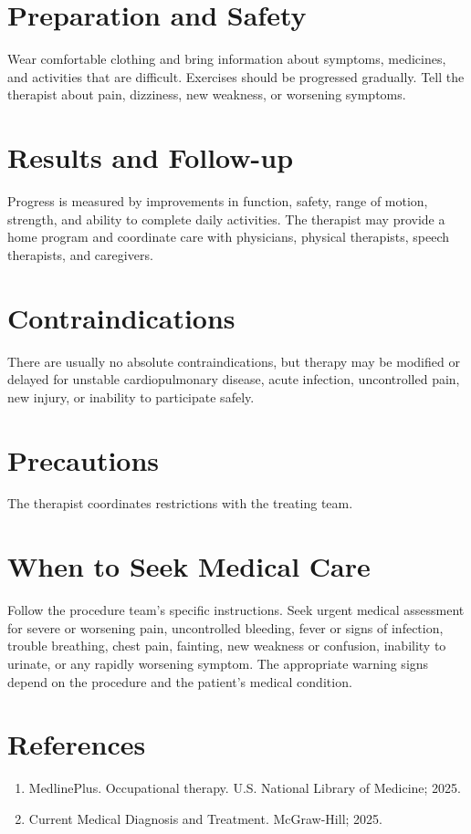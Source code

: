\section*{Preparation and Safety}
Wear comfortable clothing and bring information about symptoms, medicines, and activities that are difficult. Exercises should be progressed gradually. Tell the therapist about pain, dizziness, new weakness, or worsening symptoms.

\section*{Results and Follow-up}
Progress is measured by improvements in function, safety, range of motion, strength, and ability to complete daily activities. The therapist may provide a home program and coordinate care with physicians, physical therapists, speech therapists, and caregivers.

\section*{Contraindications}
There are usually no absolute contraindications, but therapy may be modified or delayed for unstable cardiopulmonary disease, acute infection, uncontrolled pain, new injury, or inability to participate safely.

\section*{Precautions}
The therapist coordinates restrictions with the treating team.

\section*{When to Seek Medical Care}
Follow the procedure team's specific instructions. Seek urgent medical assessment for severe or worsening pain, uncontrolled bleeding, fever or signs of infection, trouble breathing, chest pain, fainting, new weakness or confusion, inability to urinate, or any rapidly worsening symptom. The appropriate warning signs depend on the procedure and the patient's medical condition.

\section*{References}
\begin{enumerate}
  \item MedlinePlus. Occupational therapy. U.S. National Library of Medicine; 2025.
  \item Current Medical Diagnosis and Treatment. McGraw-Hill; 2025.
\end{enumerate}
\clearpage
